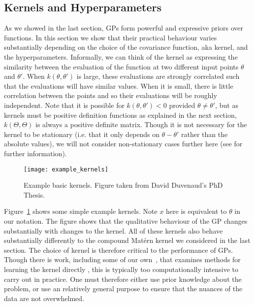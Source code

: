 \subsection{Kernels and Hyperparameters}
\label{sec:opt:gps:kernels}

As we showed in the last section, GPs form powerful and expressive priors over functions.
In this section we show that their practical behaviour varies substantially depending on the
choice of the covariance function, aka kernel, and the hyperparameters.   Informally, we can think
of the kernel as expressing the similarity between the evaluation of the function at two different input
points $\theta$ and $\theta'$.  When $k(\theta,\theta')$ is large, these evaluations are strongly
correlated such that the evaluations will have similar values.  When it is small, there is little
correlation between the points and so their evaluations will be roughly independent.  Note that
it is possible for $k(\theta,\theta')<0$ provided $\theta\neq\theta'$, but as kernels must
be positive definition functions as explained in the next section, $k\left(\Theta,\Theta\right)$ is
always a positive definite matrix.  Though it is not necessary for the kernel to be stationary (i.e.
that it only depends on $\theta-\theta'$ rather than the absolute values), we will not
consider non-stationary cases further here (see \cite{rasmussen2006gaussian} for further
information).

\begin{figure}[t]
	\centering
	\texttt{[image: example\_kernels]}
	\caption{Example basic kernels.  Figure taken from David Duvenaud's PhD
		Thesis. \label{fig:opt:example_kernels_duv}}
\end{figure}

Figure~\ref{fig:opt:example_kernels_duv}  shows
some simple example kernels.  Note $x$ here is equivalent to $\theta$ in our
notation.  The figure shows that the qualitative behaviour of the GP changes
substantially with changes to the kernel.  All of these kernels also behave
substantially differently to the compound Mat\'{e}rn kernel we considered in the last section.
The choice of kernel is therefore
critical to the performance of GPs.  Though there is work, including some of
our own~\citep{janz2016probstruct}, that examines methods 
for learning the kernel directly
\citep{duvenaud2013structure,lloyd2014automatic,wilson2014fast}, 
this is typically too computationally intensive
to carry out in practice.  One must therefore either use prior knowledge about the
problem, or use an relatively general purpose to ensure that the nuances of the
data are not overwhelmed.

